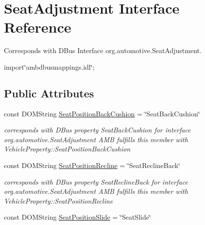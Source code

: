 \hypertarget{interfaceSeatAdjustment}{\section{Seat\+Adjustment Interface Reference}
\label{interfaceSeatAdjustment}
}


Corresponds with D\+Bus Interface org.\+automotive.\+Seat\+Adjustment.  




{\ttfamily import\char`\"{}ambdbusmappings.\+idl\char`\"{};}

\subsection*{Public Attributes}
\begin{DoxyCompactItemize}
\item 
\hypertarget{interfaceSeatAdjustment_a334764c18dc5d34fc8ca2dd9580b6990}{const D\+O\+M\+String \hyperlink{interfaceSeatAdjustment_a334764c18dc5d34fc8ca2dd9580b6990}{Seat\+Position\+Back\+Cushion} = \char`\"{}Seat\+Back\+Cushion\char`\"{}}\label{interfaceSeatAdjustment_a334764c18dc5d34fc8ca2dd9580b6990}

\begin{DoxyCompactList}\small\item\em corresponds with D\+Bus property Seat\+Back\+Cushion for interface org.\+automotive.\+Seat\+Adjustment A\+M\+B fulfills this member with Vehicle\+Property\+::\+Seat\+Position\+Back\+Cushion \end{DoxyCompactList}\item 
\hypertarget{interfaceSeatAdjustment_ad0275f9cb3dd564d491084932494b58b}{const D\+O\+M\+String \hyperlink{interfaceSeatAdjustment_ad0275f9cb3dd564d491084932494b58b}{Seat\+Position\+Recline} = \char`\"{}Seat\+Recline\+Back\char`\"{}}\label{interfaceSeatAdjustment_ad0275f9cb3dd564d491084932494b58b}

\begin{DoxyCompactList}\small\item\em corresponds with D\+Bus property Seat\+Recline\+Back for interface org.\+automotive.\+Seat\+Adjustment A\+M\+B fulfills this member with Vehicle\+Property\+::\+Seat\+Position\+Recline \end{DoxyCompactList}\item 
\hypertarget{interfaceSeatAdjustment_a19a1cdb6147bf51b16ee4c45ea16a399}{const D\+O\+M\+String \hyperlink{interfaceSeatAdjustment_a19a1cdb6147bf51b16ee4c45ea16a399}{Seat\+Position\+Slide} = \char`\"{}Seat\+Slide\char`\"{}}\label{interfaceSeatAdjustment_a19a1cdb6147bf51b16ee4c45ea16a399}


\end{DoxyCompactItemize}
